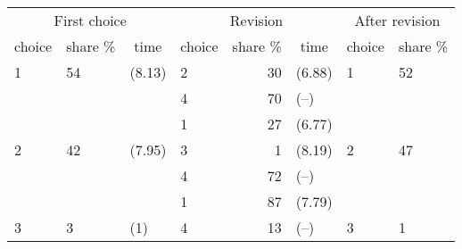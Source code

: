 
\begin{tabular}[top]{llllrlll}
\toprule
\multicolumn{3}{c}{First choice} & \multicolumn{3}{c}{Revision} & \multicolumn{2}{c}{After revision} \\
\cmidrule(l{3pt}r{3pt}){1-3} \cmidrule(l{3pt}r{3pt}){4-6} \cmidrule(l{3pt}r{3pt}){7-8}
\multicolumn{1}{c}{choice} & \multicolumn{1}{c}{share \%} & \multicolumn{1}{c}{time} & \multicolumn{1}{c}{choice} & \multicolumn{1}{c}{share \%} & \multicolumn{1}{c}{time} & \multicolumn{1}{c}{choice} & \multicolumn{1}{c}{share \%} \\
\cmidrule(l{3pt}r{3pt}){1-1} \cmidrule(l{3pt}r{3pt}){2-2} \cmidrule(l{3pt}r{3pt}){3-3} \cmidrule(l{3pt}r{3pt}){4-4} \cmidrule(l{3pt}r{3pt}){5-5} \cmidrule(l{3pt}r{3pt}){6-6} \cmidrule(l{3pt}r{3pt}){7-7} \cmidrule(l{3pt}r{3pt}){8-8}
1 & 54 & (8.13) & 2 & 30 & (6.88) & 1 & 52\\
 &  &  & 4 & 70 & (--) &  & \\
 &  &  & 1 & 27 & (6.77) &  & \\
2 & 42 & (7.95) & 3 & 1 & (8.19) & 2 & 47\\
 &  &  & 4 & 72 & (--) &  & \\
\addlinespace
 &  &  & 1 & 87 & (7.79) &  & \\
3 & 3 & (1) & 4 & 13 & (--) & 3 & 1\\
\bottomrule
\end{tabular}
